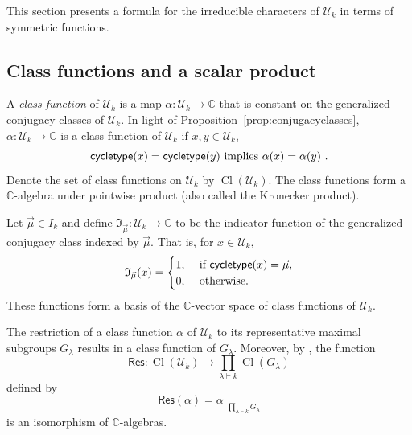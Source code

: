 \documentclass[10pt]{amsart}
\theoremstyle{definition}
\theoremstyle{remark}
\newcommand{\defncolor}{\color{darkred}}
\newcommand{\defn}[1]{{\defncolor\emph{#1}}} %
\newcommand{\CC}{\mathbb C}
\newcommand{\ind}{\mathfrak{I}}
\newcommand{\class}{\operatorname{Cl}}
\begin{document}
This section presents a formula for the irreducible characters of $\mathcal{U}_k$ in terms of symmetric functions.

\subsection{Class functions and a scalar product} \label{subsec:classfunctions}

A \defn{class function} of $\mathcal{U}_k$ is a map $\alpha: \mathcal{U}_k \to
\CC$ that is constant on the generalized conjugacy classes of $\mathcal{U}_k$.
In light of Proposition~\ref{prop:conjugacyclasses},
$\alpha: \mathcal{U}_k \to \CC$ is a class function of $\mathcal{U}_k$ if
$x, y \in \mathcal{U}_k$,
$$\mathsf{cycletype}(x) = \mathsf{cycletype}(y)\hbox{ implies }\alpha(x) = \alpha(y)~.$$
Denote the set of class functions on $\mathcal{U}_k$ by
$\class({\mathcal{U}_k})$.  The class functions form a $\CC$-algebra
under pointwise product (also called the Kronecker product).

Let $\vec{\mu} \in I_k$ and define
$\ind_{\vec{\mu}} : \mathcal{U}_k \rightarrow \CC$ to be the
indicator function of the generalized conjugacy class indexed by
$\vec{\mu}$.  That is, for $x \in \mathcal{U}_k$,
\begin{equation}\label{eq:indicator}
    \ind_{\vec{\mu}}(x) = \begin{cases}1,&\hbox{ if }\mathsf{cycletype}(x)=\vec{\mu},\\
    0,&\hbox{ otherwise.}\end{cases}
\end{equation}
These functions form a
basis of the $\CC$-vector space of class functions of $\mathcal{U}_k$.

The restriction of a class function $\alpha$ of $\mathcal{U}_k$ to its
representative maximal subgroups $G_\lambda$ results in a class function of
$G_\lambda$. Moreover, by \cite[Proposition 7.5 and Proposition 7.6]{Steinberg.2016},
the function
\begin{equation}\label{restrictionmap}
    \mathsf{Res} \colon \class(\mathcal{U}_k) \longrightarrow \prod_{\lambda \vdash k} \class(G_{\lambda})
\end{equation}
defined by
$$\mathsf{Res}(\alpha) = \alpha|_{\prod_{\lambda \vdash k} G_{\lambda}}$$
is an isomorphism of $\CC$-algebras.
\end{document}
